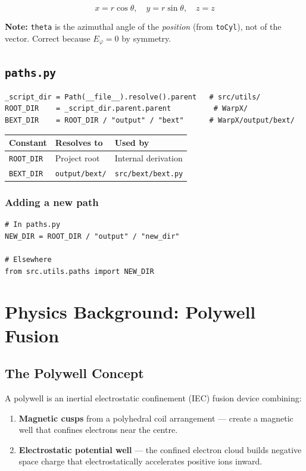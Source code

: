\documentclass[11pt, a4paper]{article}
\begin{document}
\[
x = r\cos\theta,\quad y = r\sin\theta,\quad z = z
\]

\noindent\textbf{Note:} \texttt{theta} is the azimuthal angle of the \emph{position}
(from \texttt{toCyl}), not of the vector. Correct because $E_\varphi = 0$ by symmetry.

\subsection{\texttt{paths.py}}

\begin{lstlisting}[style=python]
_script_dir = Path(__file__).resolve().parent   # src/utils/
ROOT_DIR    = _script_dir.parent.parent          # WarpX/
BEXT_DIR    = ROOT_DIR / "output" / "bext"      # WarpX/output/bext/
\end{lstlisting}

\begin{longtable}{L{3cm} L{3.5cm} L{6.5cm}}
\toprule
\textbf{Constant} & \textbf{Resolves to} & \textbf{Used by} \\
\midrule
\texttt{ROOT\_DIR} & Project root     & Internal derivation \\
\texttt{BEXT\_DIR} & \texttt{output/bext/} & \texttt{src/bext/bext.py} \\
\bottomrule
\end{longtable}

\subsubsection*{Adding a new path}
\begin{lstlisting}[style=python]
# In paths.py
NEW_DIR = ROOT_DIR / "output" / "new_dir"

# Elsewhere
from src.utils.paths import NEW_DIR
\end{lstlisting}

\section{Physics Background: Polywell Fusion}

\subsection{The Polywell Concept}

A polywell is an inertial electrostatic confinement (IEC) fusion device combining:
\begin{enumerate}
    \item \textbf{Magnetic cusps} from a polyhedral coil arrangement --- create a
          magnetic well that confines electrons near the centre.
    \item \textbf{Electrostatic potential well} --- the confined electron cloud builds
          negative space charge that electrostatically accelerates positive ions inward.
\end{enumerate}
\end{document}
